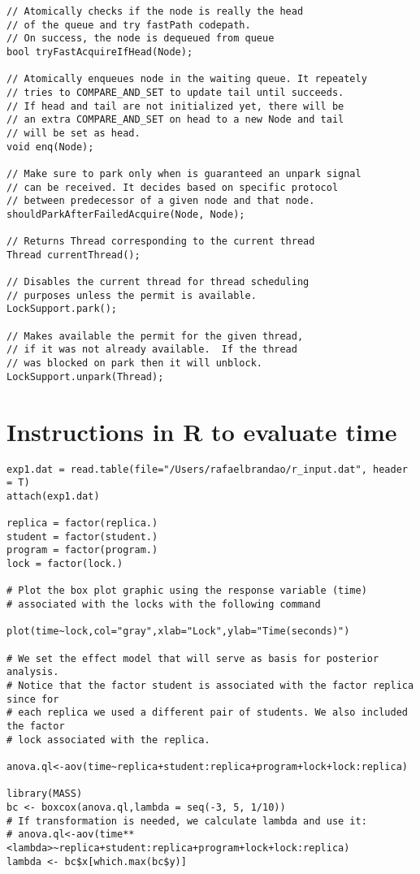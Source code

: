 \begin{appendices}
\begin{verbatim}
// Atomically checks if the node is really the head
// of the queue and try fastPath codepath.
// On success, the node is dequeued from queue
bool tryFastAcquireIfHead(Node);

// Atomically enqueues node in the waiting queue. It repeately
// tries to COMPARE_AND_SET to update tail until succeeds.
// If head and tail are not initialized yet, there will be
// an extra COMPARE_AND_SET on head to a new Node and tail
// will be set as head.
void enq(Node);

// Make sure to park only when is guaranteed an unpark signal
// can be received. It decides based on specific protocol
// between predecessor of a given node and that node.
shouldParkAfterFailedAcquire(Node, Node);

// Returns Thread corresponding to the current thread
Thread currentThread();

// Disables the current thread for thread scheduling
// purposes unless the permit is available.
LockSupport.park();

// Makes available the permit for the given thread,
// if it was not already available.  If the thread
// was blocked on park then it will unblock.
LockSupport.unpark(Thread);
\end{verbatim}


\chapter{Instructions in R to evaluate time}
\noindent
\begin{verbatim}
exp1.dat = read.table(file="/Users/rafaelbrandao/r_input.dat", header = T)
attach(exp1.dat)

replica = factor(replica.)
student = factor(student.)
program = factor(program.)
lock = factor(lock.)

# Plot the box plot graphic using the response variable (time)
# associated with the locks with the following command

plot(time~lock,col="gray",xlab="Lock",ylab="Time(seconds)")

# We set the effect model that will serve as basis for posterior analysis.
# Notice that the factor student is associated with the factor replica since for
# each replica we used a different pair of students. We also included the factor
# lock associated with the replica.

anova.ql<-aov(time~replica+student:replica+program+lock+lock:replica)

library(MASS)
bc <- boxcox(anova.ql,lambda = seq(-3, 5, 1/10))
# If transformation is needed, we calculate lambda and use it:
# anova.ql<-aov(time**<lambda>~replica+student:replica+program+lock+lock:replica)
lambda <- bc$x[which.max(bc$y)]


\end{verbatim}
\end{appendices}
